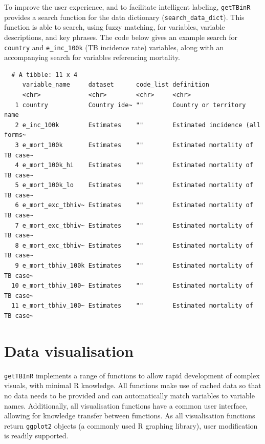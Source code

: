\documentclass[11pt,twoside]{bristolthesis}
\begin{document}
  To improve the user experience, and to facilitate intelligent labeling, \texttt{getTBinR} provides a search function for the data dictionary (\texttt{search\_data\_dict}). This function is able to search, using fuzzy matching, for variables, variable descriptions, and key phrases. The code below gives an example search for \texttt{country} and \texttt{e\_inc\_100k} (TB incidence rate) variables, along with an accompanying search for variables referencing mortality.
  \begin{Shaded}
  \begin{Highlighting}[]
  \NormalTok{(} \NormalTok{(}\NormalTok{,}\NormalTok{),}
                    \NormalTok{(}\NormalTok{), } \NormalTok{)}
  \end{Highlighting}
  \end{Shaded}
  \begin{verbatim}
  # A tibble: 11 x 4
     variable_name     dataset      code_list definition                     
     <chr>             <chr>        <chr>     <chr>                          
   1 country           Country ide~ ""        Country or territory name      
   2 e_inc_100k        Estimates    ""        Estimated incidence (all forms~
   3 e_mort_100k       Estimates    ""        Estimated mortality of TB case~
   4 e_mort_100k_hi    Estimates    ""        Estimated mortality of TB case~
   5 e_mort_100k_lo    Estimates    ""        Estimated mortality of TB case~
   6 e_mort_exc_tbhiv~ Estimates    ""        Estimated mortality of TB case~
   7 e_mort_exc_tbhiv~ Estimates    ""        Estimated mortality of TB case~
   8 e_mort_exc_tbhiv~ Estimates    ""        Estimated mortality of TB case~
   9 e_mort_tbhiv_100k Estimates    ""        Estimated mortality of TB case~
  10 e_mort_tbhiv_100~ Estimates    ""        Estimated mortality of TB case~
  11 e_mort_tbhiv_100~ Estimates    ""        Estimated mortality of TB case~
  \end{verbatim}
  \hypertarget{getbinr-vis}{%
  \section{Data visualisation}\label{getbinr-vis}}
  
  \texttt{getTBInR} implements a range of functions to allow rapid development of complex visuals, with minimal R knowledge. All functions make use of cached data so that no data needs to be provided and can automatically match variables to variable names. Additionally, all visualisation functions have a common user interface, allowing for knowledge transfer between functions. As all visualisation functions return \texttt{ggplot2} objects (a commonly used R graphing library), user modification is readily supported.
  
\end{document}
